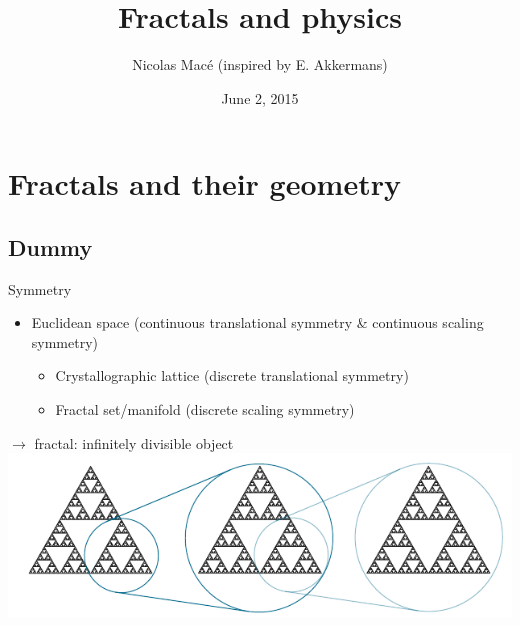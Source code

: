 \documentclass[xcolor=x11names,compress,professionalfonts]{beamer}
\renewcommand{\(}{\begin{columns}}
\renewcommand{\)}{\end{columns}}
\newcommand{\<}[1]{\begin{column}{#1}}
\renewcommand{\>}{\end{column}}
\begin{document}
\begin{frame}
\title{Fractals and physics}
\author{ Nicolas Macé (inspired by E. Akkermans) }
\date{
	June 2, 2015
}
\titlepage
\end{frame}

\section{Fractals and their geometry}
\subsection{Dummy}

\begin{frame}{Symmetry}
    \begin{itemize}
        \item Euclidean space (continuous translational symmetry \& continuous scaling symmetry)
            \begin{itemize}
                \item Crystallographic lattice (discrete translational symmetry)
                \item Fractal set/manifold (discrete scaling symmetry)
            \end{itemize}
    \end{itemize}
    
    $\rightarrow$ fractal: infinitely divisible object
    \includegraphics[scale=1.00]{sierpinski.pdf}
\end{frame}
\end{document}
